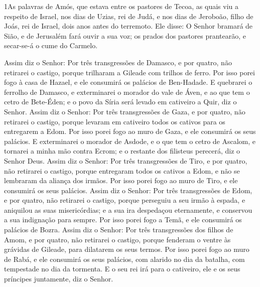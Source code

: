 
\lettrine{1} As palavras de Amós, que estava entre os pastores
de Tecoa, as quais viu a respeito de Israel, nos dias de Uzias, rei
de Judá, e nos dias de Jeroboão, filho de Joás, rei de Israel, dois
anos antes do terremoto. Ele disse: O Senhor bramará de Sião, e
de Jerusalém fará ouvir a sua voz; os prados dos pastores
prantearão, e secar-se-á o cume do Carmelo.

Assim diz o Senhor: Por três transgressões de Damasco, e por
quatro, não retirarei o castigo, porque trilharam a Gileade com
trilhos de ferro. Por isso porei fogo à casa de Hazael, e ele
consumirá os palácios de Ben-Hadade. E quebrarei o ferrolho de
Damasco, e exterminarei o morador do vale de Áven, e ao que tem o
cetro de Bete-Éden; e o povo da Síria será levado em cativeiro a
Quir, diz o Senhor. Assim diz o Senhor: Por três transgressões
de Gaza, e por quatro, não retirarei o castigo, porque levaram em
cativeiro todos os cativos para os entregarem a Edom. Por isso
porei fogo ao muro de Gaza, e ele consumirá os seus palácios. E
exterminarei o morador de Asdode, e o que tem o cetro de Ascalom, e
tornarei a minha mão contra Ecrom; e o restante dos filisteus
perecerá, diz o Senhor Deus. Assim diz o Senhor: Por três
transgressões de Tiro, e por quatro, não retirarei o castigo, porque
entregaram todos os cativos a Edom, e não se lembraram da aliança
dos irmãos. Por isso porei fogo ao muro de Tiro, e ele
consumirá os seus palácios. Assim diz o Senhor: Por três
transgressões de Edom, e por quatro, não retirarei o castigo, porque
perseguiu a seu irmão à espada, e aniquilou as suas misericórdias; e
a sua ira despedaçou eternamente, e conservou a sua indignação para
sempre. Por isso porei fogo a Temã, e ele consumirá os
palácios de Bozra. Assim diz o Senhor: Por três transgressões
dos filhos de Amom, e por quatro, não retirarei o castigo, porque
fenderam o ventre às grávidas de Gileade, para dilatarem os seus
termos. Por isso porei fogo ao muro de Rabá, e ele consumirá
os seus palácios, com alarido no dia da batalha, com tempestade no
dia da tormenta. E o seu rei irá para o cativeiro, ele e os
seus príncipes juntamente, diz o Senhor.

\medskip


